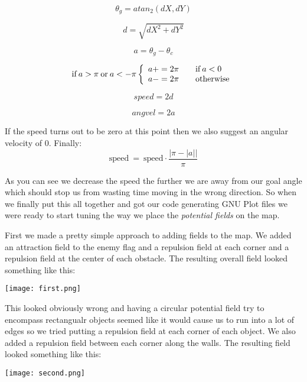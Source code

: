$$\theta_g = atan_2 (dX, dY)$$

$$d = \sqrt{dX^2 + dY^2}$$

$$a = \theta_g - \theta_c$$

\[\mbox{if}\:a > \pi\:\mbox{or}\:a < -\pi \left\{ 
\begin{array}{l l}
  a += 2\pi & \quad \mbox{if}\:a < 0\\
  a -= 2\pi & \quad \mbox{otherwise}\\ \end{array} \right. \]

$$speed = 2d$$

$$angvel = 2a$$


\par
If the speed turns out to be zero at this point then we also suggest an angular velocity of 0.  Finally:
$$\mbox{speed}\:=\:\mbox{speed}\cdot\frac{\lvert \pi - \lvert a\rvert \rvert}{\pi}$$

\par
As you can see we decrease the speed the further we are away from our goal angle which should stop us from wasting time moving in the wrong direction.  So when we finally put this all together and got our code generating GNU Plot files we were ready to start tuning the way we place the \textsl{potential fields} on the map.
\par
First we made a pretty simple approach to adding fields to the map.  We added an attraction field to the enemy flag and a repulsion field at each corner and a repulsion field at the center of each obstacle.  The resulting overall field looked something like this:
\par

\begin{center}
\texttt{[image: first.png]}
\end{center}

\par
This looked obviously wrong and having a circular potential field try to encompass rectangualr objects seemed like it would cause us to run into a lot of edges so we tried putting a repulsion field at each corner of each object.  We also added a repulsion field between each corner along the walls.  The resulting field looked something like this:
\par

\begin{center}
\texttt{[image: second.png]}
\end{center}

